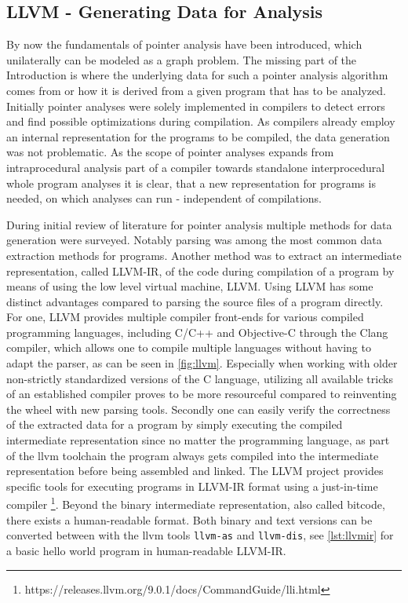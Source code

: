 \subsection{LLVM - Generating Data for Analysis}
By now the fundamentals of pointer analysis have been introduced, which unilaterally can be modeled as a graph problem.
The missing part of the Introduction is where the underlying data for such a pointer analysis algorithm comes from or how it is derived from a given program that has to be analyzed.
Initially pointer analyses were solely implemented in compilers to detect errors and find possible optimizations during compilation. As compilers already employ an internal representation for the programs to be compiled, the data generation was not problematic.
As the scope of pointer analyses expands from intraprocedural analysis part of a compiler towards standalone interprocedural whole program analyses it is clear, that a new representation for programs is needed, on which analyses can run - independent of compilations.

During initial review of literature for pointer analysis multiple methods for data generation were surveyed. Notably parsing was among the most common data extraction methods for programs. Another method was to extract an intermediate representation, called LLVM-IR, of the code during compilation of a program by means of using the low level virtual machine, LLVM. Using LLVM has some distinct advantages compared to parsing the source files of a program directly.
For one, LLVM provides multiple compiler front-ends for various compiled programming languages, including C/C++ and Objective-C through the Clang compiler, which allows one to compile multiple languages without having to adapt the parser, as can be seen in \autoref{fig:llvm}.
Especially when working with older non-strictly standardized versions of the C language, utilizing all available tricks of an established compiler proves to be more resourceful compared to reinventing the wheel with new parsing tools.
Secondly one can easily verify the correctness of the extracted data for a program by simply executing the compiled intermediate representation since no matter the programming language, as part of the llvm toolchain the program always gets compiled into the intermediate representation before being assembled and linked. The LLVM project provides specific tools for executing programs in LLVM-IR format using a just-in-time compiler \footnote{https://releases.llvm.org/9.0.1/docs/CommandGuide/lli.html}. Beyond the binary intermediate representation, also called bitcode, there exists a human-readable format. Both binary and text versions can be converted between with the llvm tools \verb|llvm-as| and \verb|llvm-dis|, see \autoref{lst:llvmir} for a basic hello world program in human-readable LLVM-IR.

